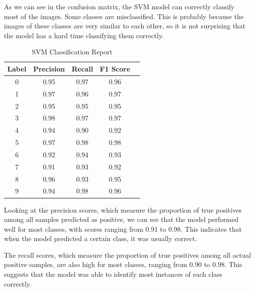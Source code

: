 \documentclass[conference]{IEEEtran}
\begin{document}
As we can see in the confusion matrix, the SVM model can correctly classify most of the images. 
Some classes are misclassified. This is probably because the images of these classes are very similar to each other, so it is not surprising that the model has a hard time classifying them correctly.
\begin{table}[!h]
    \centering
    \begin{tabular}{|c|c|c|c|r|}
        \hline
        \textbf{Label} & \textbf{Precision} & \textbf{Recall} &  \textbf{F1 Score} \\ \hline
        0              & 0.95               & 0.97            & 0.96               \\ \hline
        1              & 0.97               & 0.96            & 0.97               \\ \hline
        2              & 0.95               & 0.95            & 0.95               \\ \hline
        3              & 0.98               & 0.97            & 0.97               \\ \hline
        4              & 0.94               & 0.90            & 0.92               \\ \hline
        5              & 0.97               & 0.98            & 0.98               \\ \hline
        6              & 0.92               & 0.94            & 0.93               \\ \hline
        7              & 0.91               & 0.93            & 0.92               \\ \hline
        8              & 0.96               & 0.93            & 0.95               \\ \hline
        9              & 0.94               & 0.98            & 0.96               \\ \hline
    \end{tabular}
    \label{tab:svm_classification_report}
    \caption{SVM Classification Report}
\end{table}
Looking at the precision scores, which measure the proportion of true positives among all samples predicted as positive, we can see that the model performed well for most classes, with scores ranging from 0.91 to 0.98. This indicates that when the model predicted a certain class, it was usually correct.

The recall scores, which measure the proportion of true positives among all actual positive samples, are also high for most classes, ranging from 0.90 to 0.98. This suggests that the model was able to identify most instances of each class correctly.
\end{document}
